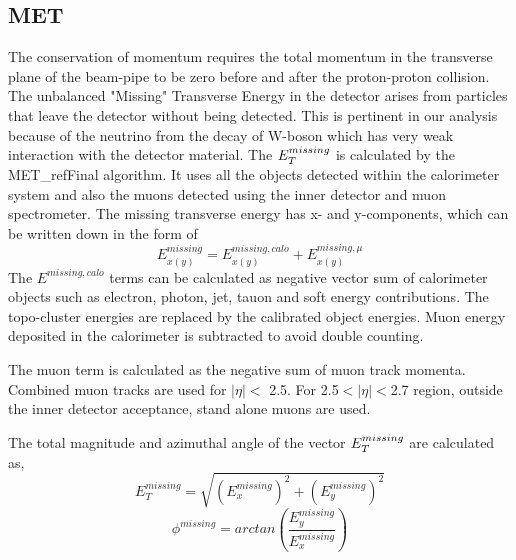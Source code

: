 \subsection{MET}
The conservation of momentum requires the total momentum in the transverse plane of the beam-pipe to be zero before and after the proton-proton collision. The unbalanced "Missing" Transverse Energy in the detector arises from particles that leave the detector without being detected. This is pertinent in our analysis because of the neutrino from the decay of W-boson which has very weak interaction with the detector material. 
The $E_{T}^{missing}$ is calculated by the MET\_refFinal algorithm. It uses all the objects detected within the calorimeter system and also the muons detected using the inner detector and muon spectrometer. The missing transverse energy has x- and y-components, which can be written down in the form of
\begin{equation}
E^{missing}_{x(y)} = E^{missing, calo}_{x(y)} + E^{missing, \mu}_{x(y)}
\end{equation}
The $E^{missing, calo}$ terms can be calculated as negative vector sum of calorimeter objects such as electron, photon, jet, tauon and soft energy contributions. The topo-cluster energies are replaced by the calibrated object energies. Muon energy deposited in the calorimeter is subtracted to avoid double counting.

The muon term is calculated as the negative sum of muon track momenta. Combined muon tracks are used for $|\eta|<$ 2.5. For 2.5$<|\eta|<$2.7 region, outside the inner detector acceptance, stand alone muons are used. 

The total magnitude and azimuthal angle of the vector $E_{T}^{missing}$ are calculated as,
\begin{equation}
E^{missing}_{T} = \sqrt{(E^{missing}_{x})^{2} + (E^{missing}_{y})^{2}}
\end{equation}
\begin{equation}
\phi^{missing} = arctan (\frac{E^{missing}_{y}}{E^{missing}_{x}})
\end{equation}